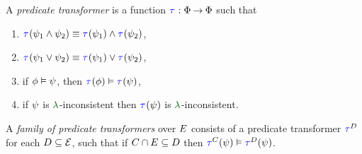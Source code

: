 \begin{scope}
  \noindent
  \begin{definition}
    \label{def:trans}
    A \emph{predicate transformer} is a function
    $\aTr{}{}:\Formulae\fun\Formulae$ such that
    \begin{enumerate}[,label=(\textsc{x}\arabic*),ref=\textsc{x}\arabic*]
    \item \label{tr-and}
      $\aTr{}{\bForm_1\land\bForm_2}\riff\aTr{}{\bForm_1}\land\aTr{}{\bForm_2}$,    
    \item \label{tr-or}
      $\aTr{}{\bForm_1\lor\bForm_2}\riff\aTr{}{\bForm_1}\lor\aTr{}{\bForm_2}$,
    \item \label{tr-implies}
      if $\phi \mathrel{\vDash} \psi$, then $\aTr{}{\aForm} \rimplies
      \aTr{}{\bForm}$,
    \item \label{tr-false}
      if $\psi$ is $\labeling$-inconsistent then $\aTr{}{\bForm}$ is $\labeling$-inconsistent.
    \end{enumerate}
  \end{definition}
  \medskip

  \noindent
  \begin{definition}
    \label{def:family}
    A \emph{family of predicate transformers} over $E$ consists of a
    predicate transformer $\aTr{\bEvs}{}$ for each $D\subseteq\mathcal{E}$,
    such that if $C \cap E \subseteq D$ then $\aTr{\cEvs}{\bForm}
    \rimplies \aTr{\bEvs}{\bForm}$.
  \end{definition}
  \medskip


\end{scope}
